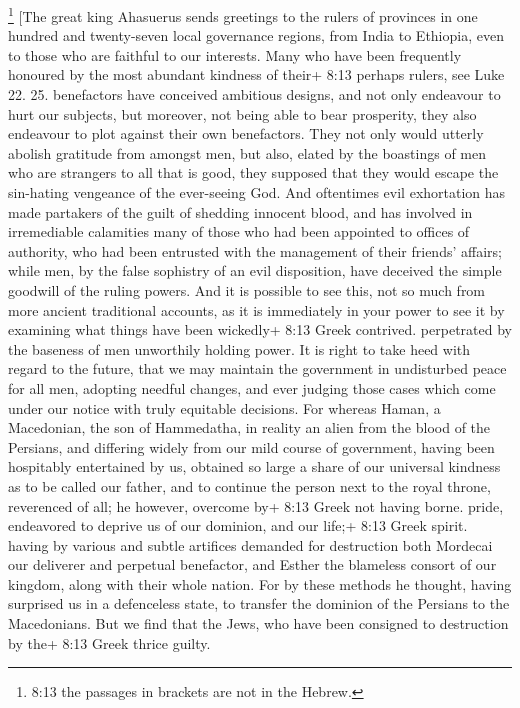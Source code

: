 \footnote{8:13 the passages in brackets are not in the Hebrew.} {[}The
great king Ahasuerus sends greetings to the rulers of provinces in one
hundred and twenty-seven local governance regions, from India to
Ethiopia, even to those who are faithful to our interests. Many who have
been frequently honoured by the most abundant kindness of their+ 8:13
perhaps rulers, see Luke 22. 25. benefactors have conceived ambitious
designs, and not only endeavour to hurt our subjects, but moreover, not
being able to bear prosperity, they also endeavour to plot against their
own benefactors. They not only would utterly abolish gratitude from
amongst men, but also, elated by the boastings of men who are strangers
to all that is good, they supposed that they would escape the sin-hating
vengeance of the ever-seeing God. And oftentimes evil exhortation has
made partakers of the guilt of shedding innocent blood, and has involved
in irremediable calamities many of those who had been appointed to
offices of authority, who had been entrusted with the management of
their friends' affairs; while men, by the false sophistry of an evil
disposition, have deceived the simple goodwill of the ruling powers. And
it is possible to see this, not so much from more ancient traditional
accounts, as it is immediately in your power to see it by examining what
things have been wickedly+ 8:13 Greek contrived. perpetrated by the
baseness of men unworthily holding power. It is right to take heed with
regard to the future, that we may maintain the government in undisturbed
peace for all men, adopting needful changes, and ever judging those
cases which come under our notice with truly equitable decisions. For
whereas Haman, a Macedonian, the son of Hammedatha, in reality an alien
from the blood of the Persians, and differing widely from our mild
course of government, having been hospitably entertained by us, obtained
so large a share of our universal kindness as to be called our father,
and to continue the person next to the royal throne, reverenced of all;
he however, overcome by+ 8:13 Greek not having borne. pride, endeavored
to deprive us of our dominion, and our life;+ 8:13 Greek spirit. having
by various and subtle artifices demanded for destruction both Mordecai
our deliverer and perpetual benefactor, and Esther the blameless consort
of our kingdom, along with their whole nation. For by these methods he
thought, having surprised us in a defenceless state, to transfer the
dominion of the Persians to the Macedonians. But we find that the Jews,
who have been consigned to destruction by the+ 8:13 Greek thrice guilty.
